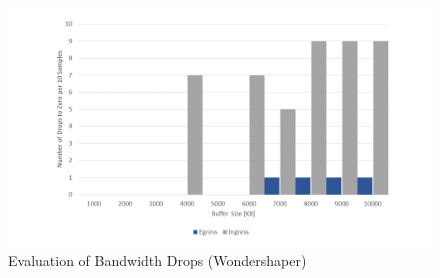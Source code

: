 \begin{figure}[h]
	\centering
	\includegraphics[width=\textwidth]{img/Evaluation-Zeros-Wondershaper.png}
	\caption{Evaluation of Bandwidth Drops (Wondershaper)}
	\label{Evaluation of the Bandwidth Drops (Wondershaper)}
\end{figure}



